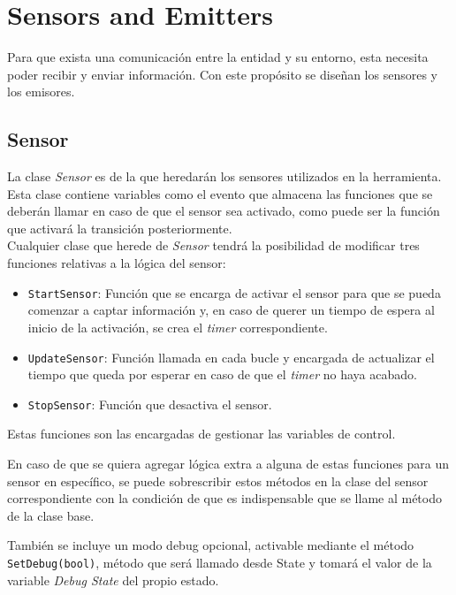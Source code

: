 \section{Sensors and Emitters}

Para que exista una comunicación entre la entidad y su entorno, esta necesita poder recibir y enviar información. Con este propósito se diseñan los sensores y los emisores.\\

\subsection{Sensor}

La clase \textit{Sensor} es de la que heredarán los sensores utilizados en la herramienta. Esta clase contiene variables como el evento que almacena las funciones que se deberán llamar en caso de que el sensor sea activado, como puede ser la función que activará la transición posteriormente.\\

Cualquier clase que herede de \textit{Sensor} tendrá la posibilidad de modificar tres funciones relativas a la lógica del sensor:

\begin{itemize}
	\item \texttt{StartSensor}: Función que se encarga de activar el sensor para que se pueda comenzar a captar información y, en caso de querer un tiempo de espera al inicio de la activación, se crea el \textit{timer} correspondiente.
	\item \texttt{UpdateSensor}: Función llamada en cada bucle y encargada de actualizar el tiempo que queda por esperar en caso de que el \textit{timer} no haya acabado.
	\item \texttt{StopSensor}: Función que desactiva el sensor.
\end{itemize}
Estas funciones son las encargadas de gestionar las variables de control.

En caso de que se quiera agregar lógica extra a alguna de estas funciones para un sensor en específico, se puede sobrescribir estos métodos en la clase del sensor correspondiente con la condición de que es indispensable que se llame al método de la clase base.

También se incluye un modo debug opcional, activable mediante el método \texttt{SetDebug(bool)}, método que será llamado desde State y tomará el valor de la variable \textit{Debug State} del propio estado.\\

